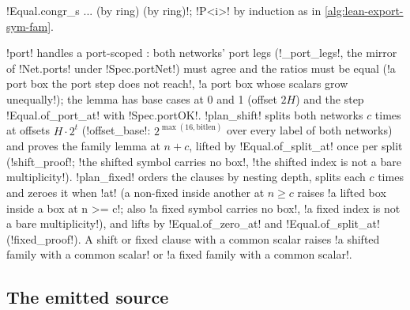 {{{\begin{algorithm}
\begin{enumerate}
\lexlean!Equal.congr_s ... (by ring) (by ring)!; \lexlean!P<i>! by induction as in
\cref{alg:lean-export-sym-fam}.
\end{enumerate}
\end{algorithm}
\lexpy!port! handles a port-scoped \bbox: both networks' port legs (\lexpy!_port_legs!, the mirror of
\lexlean!Net.ports! under \lexlean!Spec.portNet!) must agree and the ratios must be equal
(\lexcode!a port box the port step does not reach!, \lexcode!a port box whose scalars grow unequally!);
the lemma has base cases at 0 and 1 (offset $2H$) and the step \lexlean!Equal.of_port_at! with
\lexlean!Spec.portOK!. \lexpy!plan_shift! splits both networks $c$ times at offsets $H\cdot 2^{t}$
(\lexpy!offset_base!: $2^{\max(16,\mathrm{bitlen})}$ over every label of both networks) and
proves the family lemma at $n+c$, lifted by \lexlean!Equal.of_split_at! once per split
(\lexpy!shift_proof!; \lexcode!the shifted symbol carries no box!,
\lexcode!the shifted index is not a bare multiplicity!). \lexpy!plan_fixed! orders the clauses by
nesting depth, splits each $c$ times and zeroes it when \lexcode!at! (a non-fixed \bbox inside
another at $n \ge c$ raises \lexcode!a lifted box inside a box at n >= c!; also
\lexcode!a fixed symbol carries no box!, \lexcode!a fixed index is not a bare multiplicity!), and lifts
by \lexlean!Equal.of_zero_at! and \lexlean!Equal.of_split_at! (\lexpy!fixed_proof!). A shift or fixed
clause with a common scalar raises \lexcode!a shifted family with a common scalar! or
\lexcode!a fixed family with a common scalar!.

\subsection{The emitted source}\label{sec:lean-export-sym-source}

}}}
